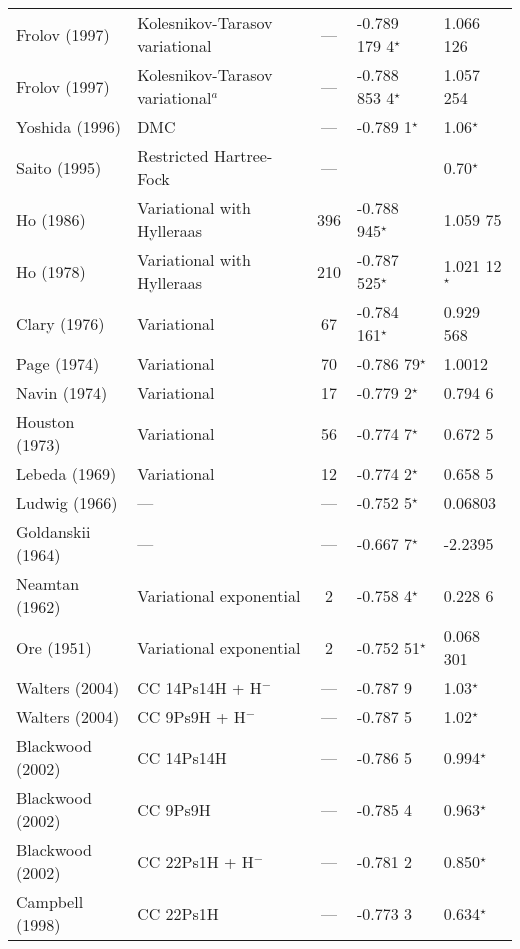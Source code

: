 \documentclass[Dissertation.tex]{subfiles}
\begin{document}
\begin{center}
\begin{longtable}{l l c l l}
Frolov (1997) \cite{Frolov1997c} & Kolesnikov-Tarasov variational & --- & -0.789 179 4$^\star$ & 1.066 126 \\
Frolov (1997) \cite{Frolov1997c} & Kolesnikov-Tarasov variational$^a$ & --- & -0.788 853 4$^\star$ & 1.057 254 \\
Yoshida (1996) \cite{Yoshida1996} & DMC & --- & -0.789 1$^\star$ & 1.06$^\star$ \\
Saito (1995) \cite{Saito1995} & Restricted Hartree-Fock & --- &  & 0.70$^\star$ \\
Ho (1986) \cite{Ho1986} & Variational with Hylleraas & 396 & -0.788 945$^\star$ & 1.059 75 \\
Ho (1978) \cite{Ho1978} & Variational with Hylleraas & 210 & -0.787 525$^\star$ & 1.021 12$^\star$ \\
Clary (1976) \cite{Clary1976} & Variational & 67 & -0.784 161$^\star$ & 0.929 568 \\
Page (1974) \cite{Page1974} & Variational & 70 & -0.786 79$^\star$ & 1.0012 \\
Navin (1974) \cite{Navin1974} & Variational & 17 & -0.779 2$^\star$ & 0.794 6 \\
Houston (1973) \cite{Houston1973} & Variational & 56 & -0.774 7$^\star$ & 0.672 5 \\
Lebeda (1969) \cite{Lebeda1969} & Variational & 12 & -0.774 2$^\star$ & 0.658 5 \\
Ludwig (1966) \cite{Ludwig1966} & --- & --- & -0.752 5$^\star$ & 0.06803 \\
Goldanskii (1964) \cite{Clary1976} & --- & --- & -0.667 7$^\star$ & -2.2395 \\
Neamtan (1962) \cite{Neamtan1962} & Variational exponential & 2 & -0.758 4$^\star$ & 0.228 6 \\*
Ore (1951) \cite{Ore1951} & Variational exponential & 2 & -0.752 51$^\star$ & 0.068 301 \\*
Walters (2004) \cite{Walters2004} & CC 14Ps14H + H$^-$ & --- & -0.787 9 & 1.03$^\star$\\*
Walters (2004) \cite{Walters2004} & CC 9Ps9H + H$^-$ & --- & -0.787 5 & 1.02$^\star$\\*
Blackwood (2002) \cite{Blackwood2002} & CC 14Ps14H & --- & -0.786 5  & 0.994$^\star$ \\*
Blackwood (2002) \cite{Blackwood2002} & CC 9Ps9H & --- & -0.785 4 & 0.963$^\star$ \\*
Blackwood (2002) \cite{Blackwood2002b} & CC 22Ps1H + H$^-$ & --- & -0.781 2 & 0.850$^\star$ \\*
Campbell (1998) \cite{Campbell1998} & CC 22Ps1H & --- & -0.773 3 & 0.634$^\star$ \\*
\bottomrule
\end{longtable}
\end{center}
\end{document}
